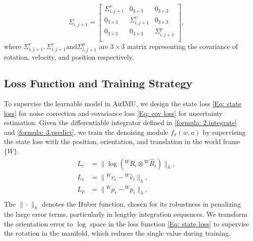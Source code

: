 \begin{equation}
\Sigma_{i,j+1} = 
\begin{bmatrix}
\Sigma^r_{i,j+1} & 0_{3 \times 3} & 0_{3 \times 3}\\
0_{3 \times 3} & \Sigma^v_{i,j+1} & 0_{3 \times 3} \\
0_{3 \times 3} & 0_{3 \times 3} & \Sigma^p_{i,j+1} \\
\end{bmatrix},
\end{equation}
where $\Sigma^r_{i,j+1}, \Sigma^v_{i,j+1} \text{and} \Sigma^p_{i,j+1}$ are $3\times 3$ matrix representing the covariance of rotation, velocity, and position respectively.

\subsection{Loss Function and Training Strategy}
\label{Model: Loss}

To supervise the learnable model in AirIMU, we design the state loss \eqref{Eq: state loss} for noise correction and covariance loss \eqref{Eq: cov loss} for uncertainty estimation.
Given the differentiable integrator defined in \eqref{formula: 2.integrate} and \eqref{formula: 3.predict}, we train the denoising module $f_\pi(w, a)$ by supervising the state loss with the position, orientation, and translation in the world frame $\{W\}$.
\begin{equation}
\label{Eq: state loss}
    \begin{split}
        L_r &= \| \log({}^W R_i \otimes {}^W \hat R_i) \|_h, \\
        L_v &= \| {}^W v_i -  {}^W \hat v_i \|_h, \\
        L_p &= \| {}^W p_i - \hat {}^W p_i \|_h. \\
    \end{split}
\end{equation}
The $\| \cdot \|_h$ denotes the Huber function, chosen for its robustness in penalizing the large error terms, particularly in lengthy integration sequences.
We transform the orientation error to $\log$ space in the loss function \eqref{Eq: state loss} to supervise the rotation in the manifold, which reduces the single value during training.

